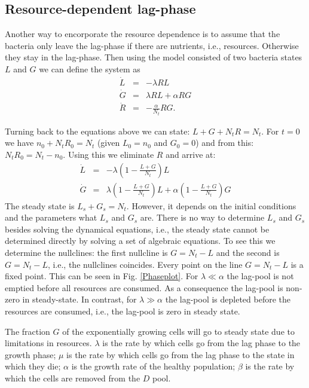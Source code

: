\documentclass[10pt,A4paper]{article}
\begin{document}


\subsection{Resource-dependent lag-phase}

Another way to encorporate the resource dependence is to assume that the bacteria only leave the lag-phase if there are nutrients, i.e., resources. 
Otherwise they stay in the lag-phase.
Then using the model consisted of two bacteria states $L$ and $G$ we can define the system as
\begin{eqnarray}
\dot{L} &=& - \lambda R L\\
\dot{G} &=& \lambda R L +\alpha R G\\
\dot{R} &=&-\frac{\alpha}{N_t} R G.
\end{eqnarray}


Turning back to the equations above we can state: $L+G+N_tR=N_t$. For $t=0$ we have $n_0+N_tR_0=N_t$ (given $L_0=n_0$ and $G_0=0$) and from this: $N_tR_0=N_t-n_0$. Using this we eliminate $R$ and arrive at: 
\begin{eqnarray}
\dot{L} &=& - \lambda \left(1-\frac{L+G}{N_t}\right)L\\
\dot{G} &=& \lambda \left(1-\frac{L+G}{N_t}\right)L +\alpha \left(1-\frac{L+G}{N_t}\right) G
\end{eqnarray}
The steady state is $L_s+G_s=N_t$. However, it depends on the initial conditions and the parameters what $L_s$ and $G_s$ are. There is no way to determine $L_s$ and $G_s$ besides solving the dynamical equations, i.e., the steady state cannot be determined directly by solving a set of algebraic equations. To see this we determine the nullclines: the first nullcline is $G=N_t-L$ and the second is $G=N_t-L$, i.e., the nullclines coincides. Every point on the line $G=N_t-L$ is a fixed point. 
This can be seen in Fig. \ref{Phaseplot}. 
For $\lambda\ll \alpha$ the lag-pool is not emptied before all resources are consumed. As a consequence the lag-pool is non-zero in steady-state. 
In contrast, for $\lambda\gg \alpha$ the lag-pool is depleted before the resources are consumed, i.e., the lag-pool is zero in steady state.

The fraction $G$ of the exponentially growing cells will go to steady state due to limitations in resources. 
$\lambda$ is the rate by which cells go from the lag phase to the growth phase; $\mu$ is the rate by which cells go from the lag phase to the state in which they die; $\alpha$ is the growth rate of the healthy population; $\beta$ is the rate by which the cells are removed from the $D$ pool. 
\end{document}
